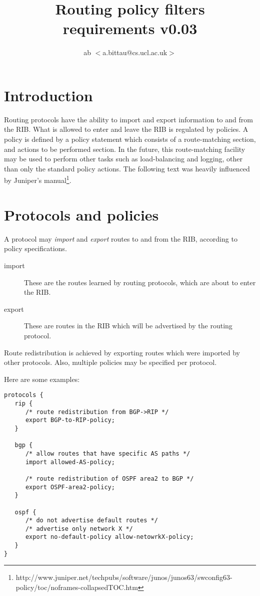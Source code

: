 \documentclass{article}
\title{Routing policy filters\\requirements v0.03}
\author{ab $<$a.bittau@cs.ucl.ac.uk$>$}
\begin{document}
\maketitle

\section{Introduction}
Routing protocols have the ability to import and export information to and from the RIB.
What is allowed to enter and leave the RIB is regulated by policies. A policy is
defined by a policy statement which consists of a route-matching section, and
actions to be performed section. In the future, this route-matching facility may
be used to perform other tasks such as load-balancing and logging, other than
only the standard policy actions. The following text was heavily influenced by
Juniper's
manual\footnote{http://www.juniper.net/techpubs/software/junos/junos63/swconfig63-policy/toc/noframes-collapsedTOC.htm}.

\section{Protocols and policies}
A protocol may {\em import} and {\em export} routes to and from the RIB, according to policy
specifications. 
\begin{description}
\item[import] These are the routes learned by routing protocols, which are about
to enter the RIB. 
\item[export] These are routes in the RIB which will be advertised by
the routing protocol.
\end{description}

Route redistribution is achieved by exporting routes which were imported by
other protocols. Also, multiple policies may be specified per protocol.

Here are some examples:
\begin{verbatim}
protocols {
   rip {
      /* route redistribution from BGP->RIP */
      export BGP-to-RIP-policy;
   }
   
   bgp {
      /* allow routes that have specific AS paths */ 
      import allowed-AS-policy;

      /* route redistribution of OSPF area2 to BGP */
      export OSPF-area2-policy;
   }

   ospf {
      /* do not advertise default routes */
      /* advertise only network X */
      export no-default-policy allow-netowrkX-policy;
   }
}
\end{verbatim}
\end{document}
